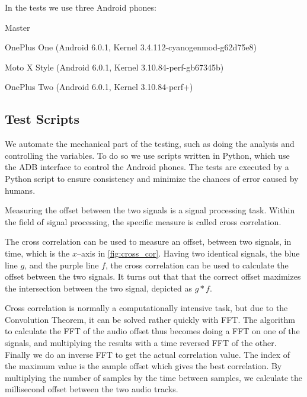 In the tests we use three Android phones:
\begin{dankscription}{\bfseries}{Master}
	\item[Master]OnePlus One (Android 6.0.1, Kernel 3.4.112-cyanogenmod-g62d75e8)
	\item[Slave 1]Moto X Style (Android 6.0.1, Kernel 3.10.84-perf-gb67345b)
	\item[Slave 2]OnePlus Two (Android 6.0.1, Kernel 3.10.84-perf+)
\end{dankscription}

\subsection{Test Scripts}
We automate the mechanical part of the testing, such as doing the
analysis and controlling the variables. To do so we use scripts written
in Python, which use the \ac{ADB} interface to control the Android
phones. The tests are executed by a Python script to ensure
consistency and minimize the chances of error caused by humans.

Measuring the offset between the two signals is a signal processing
task. Within the field of signal processing, the specific measure is
called cross correlation. 

The cross correlation can be used to measure an offset, between two signals, in time, which is the $x$--axis in \cref{fig:cross_cor}.
Having two identical signals, the blue line $g$, and the purple line $f$, the cross correlation can be used to calculate the offset between the two signals. 
It turns out that that the correct offset maximizes the intersection between the two signal, depicted as $g * f$.

Cross correlation is normally
a computationally intensive task, but due to the Convolution
Theorem\cite{conv_theo}, it can be solved rather quickly with \ac{FFT}.
The algorithm to calculate the \ac{FFT} of the audio offset thus becomes
doing a \ac{FFT} on one of the signals, and multiplying the results with
a time reversed \ac{FFT} of the other. Finally we do an inverse \ac{FFT}
to get the actual correlation value. The index of the maximum value is
the sample offset which gives the best correlation.
By multiplying the
number of samples by the time between samples, we calculate the
millisecond offset between the two audio tracks.




